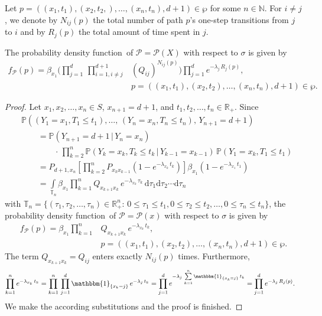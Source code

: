 \documentclass[smallextended]{svjour3}
\newcommand{\R}{\mathbb{R}}
\newcommand{\N}{\mathbb{N}}
\renewcommand{\P}{\mathbb{P}}
\newcommand{\suml}{\sum\limits}
\newcommand{\prodl}{\prod\limits}
\newcommand{\intl}{\int\limits}
\newcommand{\pdf}{probability density function}
\begin{document}
Let $p=((x_1,t_1),(x_2,t_2,),\ldots,(x_n,t_n),d+1)\in\wp$ for some $n\in\N$.
For $i\neq j$, we denote by $N_{ij}(p)$ the total number of path $p$'s one-step transitions from $j$ to $i$ and by $R_j(p)$ the total amount of time spent in $j$.

\begin{theorem}\label{theorem:path_pdf}
	The \pdf\ of $\mathcal{P}=\mathcal{P}(X)$ with respect to $\sigma$ is given by
	\begin{align*}
		f_{\mathcal{P}}(p) = \beta_{x_1}\Bigg(\prodl_{j=1}^d\,\prodl_{i=1,i\neq j}^{d+1} &(Q_{ij})^{N_{ij}(p)}\Bigg)\prodl_{j=1}^d e^{-\lambda_j\,R_j(p)},\\
		& p=((x_1,t_1),(x_2,t_2),\ldots,(x_n,t_n),d+1)\in\wp.
	\end{align*}
\end{theorem}

\begin{proof}
	Let $x_1,x_2,\ldots,x_n\in S$, $x_{n+1}=d+1$, and $t_1,t_2,\ldots,t_n\in\R_+$.
	Since
	\begin{align*}
		&\P((Y_1=x_1,T_1\leq t_1),\ldots,\,(Y_n=x_n,T_n\leq t_n),\, Y_{n+1}=d+1) \\
		&\qquad= \P(Y_{n+1}=d+1\,|\,Y_n=x_n)\\
		&\qquad\qquad\cdot\,\prodl_{k=2}^n \P(Y_k=x_k,T_k\leq t_k\,|\,Y_{k-1}=x_{k-1})\,\P(Y_1=x_k,T_1\leq t_1)\\
		&\qquad= P_{d+1,x_n}\left[\prodl_{k=2}^n P_{x_{k} x_{k-1}}\left(1-e^{-\lambda_{x_k}\,t_k}\right)\right] \beta_{x_1}\left(1-e^{-\lambda_{x_1}\,t_1}\right)\\
		&\qquad= \intl_{\mathbb{T}_n} \beta_{x_1}\prodl_{k=1}^n Q_{x_{k+1}x_k}\,e^{-\lambda_{x_k}\,\tau_k}\,\mathrm{d}\tau_1\mathrm{d}\tau_2\cdots\mathrm{d}\tau_n
	\end{align*}
	with $\mathbb{T}_n=\{(\tau_1,\tau_2,\ldots,\tau_n)\in\R^n_+:\,0\leq\tau_1\leq t_1,0\leq\tau_2\leq t_2,\ldots,0\leq\tau_n\leq t_n\}$,
	the \pdf\ of $\mathcal{P}=\mathcal{P}(x)$ with respect to $\sigma$ is given by
	\begin{align*}
		f_{\mathcal{P}}(p) = \beta_{x_1}\prodl_{k=1}^n &Q_{x_{k+1}x_k}\,e^{-\lambda_{x_k}\,t_k},\\
		& p=((x_1,t_1),(x_2,t_2),\ldots,(x_n,t_n),d+1)\in\wp.
	\end{align*}
	The term $Q_{x_{k+1}x_k}=Q_{ij}$ enters exactly $N_{ij}(p)$ times.
	Furthermore,
	\begin{align*}
		\prodl_{k=1}^n e^{-\lambda_{x_k}\,t_k} &= \prodl_{k=1}^n\,\prodl_{j=1}^d \mathbbm{1}_{\{x_k=j\}}\,e^{-\lambda_j\,t_k}
		= \prodl_{j=1}^d e^{-\lambda_j\,\suml_{k=1}^n \mathbbm{1}_{\{x_k=j\}}\,t_k}
		= \prodl_{j=1}^d e^{-\lambda_j\,R_j(p)}.
	\end{align*}
	We make the according substitutions and the proof is finished.
\end{proof}
\end{document}
